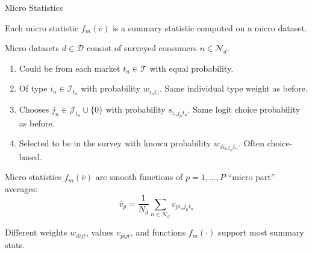 \documentclass[aspectratio=169,t,11pt,table]{beamer}
\begin{document}
\begin{frame}{Micro Statistics}
    \begin{wideitemize}
        \item Each micro statistic $f_m(\overline{v})$ is a summary statistic computed on a micro dataset.
        \pause
        \item Micro datasets $d \in \mathcal{D}$ consist of surveyed consumers $n \in \mathcal{N}_d$.
        \pause
        \begin{enumerate}
            \item Could be from each market $t_n \in \mathcal{T}$ with equal probability.
            \pause
            \item Of type $i_n \in \mathcal{I}_{t_n}$ with probability $w_{i_nt_n}$. Same individual type weight as before.
            \pause
            \item Chooses $j_n \in \mathcal{J}_{t_n} \cup \{0\}$ with probability $s_{i_nj_nt_n}$. Same logit choice probability as before.
            \pause
            \item Selected to be in the survey with known probability $w_{di_nj_nt_n}$. Often \alert{choice-based}.
        \end{enumerate}
        \pause
        \item Micro statistics $f_m(\overline{v})$ are smooth functions of $p = 1, \dots, P$ ``micro part'' averages:
        \begin{equation*}
            \overline{v}_p = \frac{1}{N_d} \sum_{n \in \mathcal{N}_d} v_{pi_nj_nt_n}
        \end{equation*}
        \vspace{-\baselineskip}
        \pause
        \item Different weights $w_{dijt}$, values $v_{pijt}$, and functions $f_m(\cdot)$ support most summary stats. 
    \end{wideitemize}
\end{frame}
\end{document}

